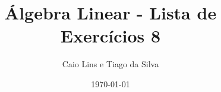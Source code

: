 \documentclass[leqno]{article}
\begin{document}
\newtheorem{teo}{Teorema}[section] \newtheorem*{teo*}{Teorema}
\newtheorem{prop}[teo]{Proposição} \newtheorem*{prop*}{Proposição}
\newtheorem{lema}[teo]{Lemma} \newtheorem*{lema*}{Lema}
\newtheorem{cor}[teo]{Corolário} \newtheorem*{cor*}{Corolário}

\theoremstyle{definition}
\newtheorem{defi}[teo]{Definição} \newtheorem*{defi*}{Definição}
\newtheorem{exem}[teo]{Exemplo} \newtheorem*{exem*}{Exemplo}
\newtheorem{obs}[teo]{Observação} \newtheorem*{obs*}{Observação}
\newtheorem*{hipo}{Hipóteses}
\newtheorem*{nota}{Notação}

\newcommand{\ds}{\displaystyle} \newcommand{\nl}{\newline}
\newcommand{\eps}{\varepsilon} \newcommand{\ssty}{\scriptstyle}
\newcommand{\bE}{\mathbb{E}}
\newcommand{\cB}{\mathcal{B}}
\newcommand{\cF}{\mathcal{F}}
\newcommand{\cA}{\mathcal{A}}
\newcommand{\cM}{\mathcal{M}}
\newcommand{\cD}{\mathcal{D}}
\newcommand{\cN}{\mathcal{N}}
\newcommand{\cL}{\mathcal{L}}
\newcommand{\cLN}{\mathcal{LN}}
\newcommand{\bP}{\mathbb{P}}
\newcommand{\bQ}{\mathbb{Q}}
\newcommand{\bN}{\mathbb{N}}
\newcommand{\bR}{\mathbb{R}}
\newcommand{\bZ}{\mathbb{Z}}

\newcommand{\bfw}{\mathbf{w}}
\newcommand{\bfv}{\mathbf{v}}
\newcommand{\bfu}{\mathbf{u}}
\newcommand{\bfx}{\mathbf{x}}
\newcommand{\bfb}{\mathbf{b}}

\newcommand{\bvecc}[2]{%
  \begin{bmatrix} #1 \\ #2  \end{bmatrix}
}
\newcommand{\bveccc}[3]{%
  \begin{bmatrix} #1 \\ #2 \\ #3  \end{bmatrix}
}

\newenvironment{sol} 
{
    \vspace{4mm}
    \noindent\textbf{Resolução:}
    \strut\newline
    \smallskip
    \hspace{-3.5mm} 
} 
{\noindent\rule{4cm}{.1mm}}


\title{Álgebra Linear - Lista de Exercícios 8}

\author{Caio Lins e Tiago da Silva}

\date{\today}

\maketitle
\end{document}
